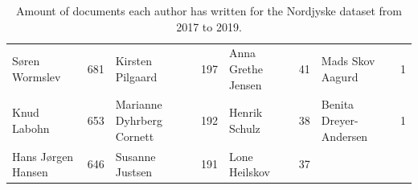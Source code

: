 \begin{table}[h]
\begin{tabular}{l|c|l|c|l|c|l|c}
		Søren Wormslev        &  681   & Kirsten Pilgaard           &  197   & Anna Grethe Jensen           &   41   & Mads Skov Aagurd             &   1    \\
		Knud Labohn           &  653   & Marianne Dyhrberg Cornett  &  192   & Henrik Schulz                &   38   & Benita Dreyer-Andersen       &   1    \\
		Hans Jørgen Hansen    &  646   & Susanne Justsen            &  191   & Lone Heilskov                &   37   &                              &        \\
		\bottomrule
	\end{tabular}
	\caption{Amount of documents each author has written for the Nordjyske dataset from 2017 to 2019.}
	\label{tab:author_table}
\end{table}
